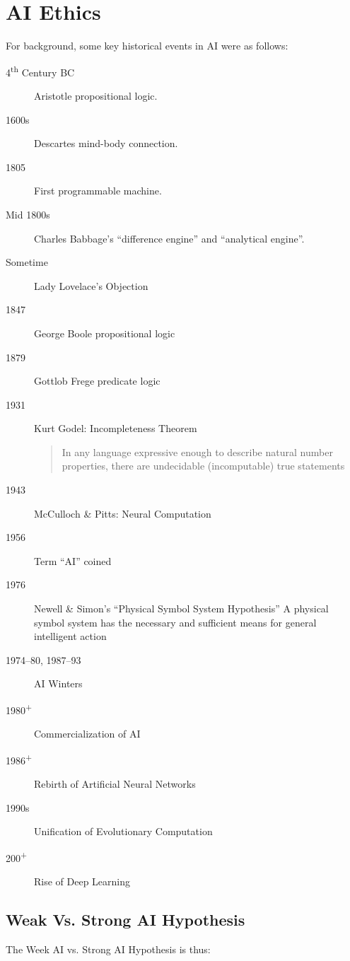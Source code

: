 %
%
%

\section{AI Ethics}
For background, some key historical events in AI were as follows:

\begin{description}
    \item[4\textsuperscript{th} Century BC] Aristotle propositional logic.
    \item[1600s] Descartes mind-body connection.
    \item[1805] First programmable machine.
    \item[Mid 1800s] Charles Babbage's ``difference engine'' and ``analytical engine''.
    \item[Sometime] Lady Lovelace's Objection
    \item[1847] George Boole propositional logic
    \item[1879] Gottlob Frege predicate logic
    \item[1931] Kurt Godel: Incompleteness Theorem
        \begin{quote}
            In any language expressive enough to describe natural number properties, there are undecidable (incomputable) true statements
        \end{quote}

    \item[1943] McCulloch \& Pitts: Neural Computation
    \item[1956] Term ``AI'' coined
    \item[1976] Newell \& Simon's ``Physical Symbol System Hypothesis'' A physical symbol system has the necessary and sufficient means for general intelligent action
    \item[1974--80, 1987--93] AI Winters
    \item[1980\textsuperscript{+}] Commercialization of AI
    \item[1986\textsuperscript{+}]  Rebirth of Artificial Neural Networks
    \item[1990s] Unification of Evolutionary Computation
    \item[200\textsuperscript{+}] Rise of Deep Learning
\end{description}

\subsection{Weak Vs. Strong AI Hypothesis}
The Week AI vs. Strong AI Hypothesis is thus:


